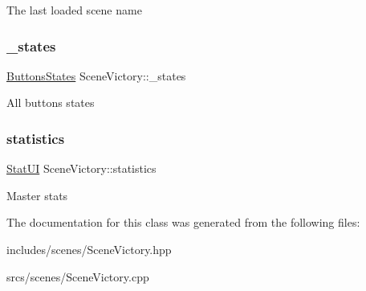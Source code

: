 The last loaded scene name \mbox{\label{class_scene_victory_ae5a9926553871dad10cbc0d402e59357}} 
\subsubsection{\texorpdfstring{\+\_\+states}{\_states}}
{\footnotesize\ttfamily \hyperlink{struct_scene_victory_1_1_buttons_states}{Buttons\+States} Scene\+Victory\+::\+\_\+states\hspace{0.3cm}{\ttfamily [protected]}}

All buttons states \mbox{\label{class_scene_victory_acdbd9784850934363227fc65c87a29c6}} 
\subsubsection{\texorpdfstring{statistics}{statistics}}
{\footnotesize\ttfamily \hyperlink{struct_scene_victory_1_1_stat_u_i}{Stat\+UI} Scene\+Victory\+::statistics\hspace{0.3cm}{\ttfamily [protected]}}

Master stats 

The documentation for this class was generated from the following files\+:\begin{DoxyCompactItemize}
\item 
includes/scenes/Scene\+Victory.\+hpp\item 
srcs/scenes/Scene\+Victory.\+cpp\end{DoxyCompactItemize}
